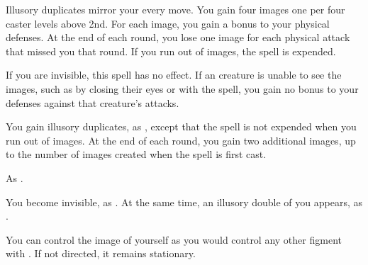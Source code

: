 \begin{spellheader}
\end{spellheader}
\begin{spelleffects}
    \spelleffect Illusory duplicates mirror your every move. You gain four images \add one per four caster levels above 2nd. For each image, you gain a  bonus to your physical defenses. At the end of each round, you lose one image for each physical attack that missed you that round. If you run out of images, the spell is expended.
\end{spelleffects}
\begin{spellfooter}
    \spellnotes If you are invisible, this spell has no effect. If an creature is unable to see the images, such as by closing their eyes or with the  spell, you gain no bonus to your defenses against that creature's attacks.
\end{spellfooter}

\begin{spellheader}
    \spelldur{\durshort \dismissable}
\end{spellheader}
\begin{spelleffects}
    \spelleffect You gain illusory duplicates, as , except that the spell is not expended when you run out of images. At the end of each round, you gain two additional images, up to the number of images created when the spell is first cast.
\end{spelleffects}
\begin{spellfooter}
    \spellnotes As .
\end{spellfooter}

\begin{spellheader}
    \spelldur{\durshort \dismissable}
\end{spellheader}
\begin{spelleffects}
    \spelleffect You become invisible, as . At the same time, an illusory double of you appears, as .

    You can control the image of yourself as you would control any other figment with . If not directed, it remains stationary.
\end{spelleffects}
\begin{spellfooter}

\end{spellfooter}


